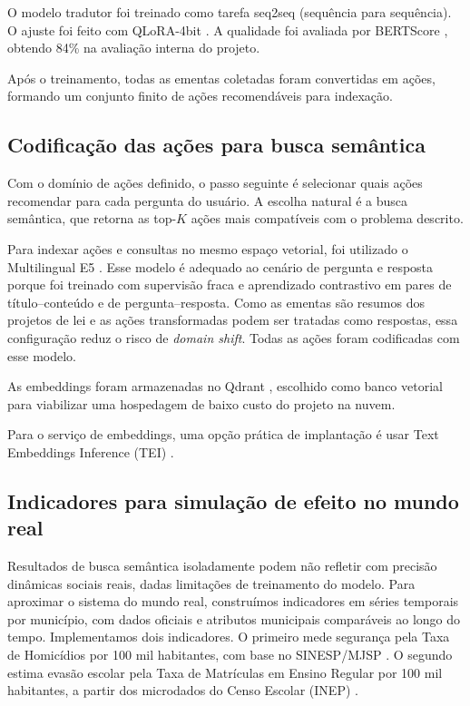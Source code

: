 \documentclass[10pt,a4paper]{article}
\begin{document}
O modelo tradutor foi treinado como tarefa seq2seq (sequência para sequência). O ajuste foi feito com QLoRA-4bit \cite{dettmers_qlora_2023}. A qualidade foi avaliada por BERTScore \cite{zhang_bertscore_2019}, obtendo 84\% na avaliação interna do projeto.

Após o treinamento, todas as ementas coletadas foram convertidas em ações, formando um conjunto finito de ações recomendáveis para indexação.

\subsection{Codificação das ações para busca semântica}
\label{sec:busca}

Com o domínio de ações definido, o passo seguinte é selecionar quais ações recomendar para cada pergunta do usuário. A escolha natural é a busca semântica, que retorna as top-$K$ ações mais compatíveis com o problema descrito.

Para indexar ações e consultas no mesmo espaço vetorial, foi utilizado o Multilingual E5 \cite{wang_e5_2024}. Esse modelo é adequado ao cenário de pergunta e resposta porque foi treinado com supervisão fraca e aprendizado contrastivo em pares de título--conteúdo e de pergunta--resposta. Como as ementas são resumos dos projetos de lei e as ações transformadas podem ser tratadas como respostas, essa configuração reduz o risco de \textit{domain shift}. Todas as ações foram codificadas com esse modelo.

As embeddings foram armazenadas no Qdrant \cite{qdrant_overview,qdrant_collections}, escolhido como banco vetorial para viabilizar uma hospedagem de baixo custo do projeto na nuvem.

Para o serviço de embeddings, uma opção prática de implantação é usar Text Embeddings Inference (TEI) \cite{hf_tei}.

\subsection{Indicadores para simulação de efeito no mundo real}
\label{sec:indicadores}

Resultados de busca semântica isoladamente podem não refletir com precisão dinâmicas sociais reais, dadas limitações de treinamento do modelo. Para aproximar o sistema do mundo real, construímos indicadores em séries temporais por município, com dados oficiais e atributos municipais comparáveis ao longo do tempo. Implementamos dois indicadores. O primeiro mede segurança pela Taxa de Homicídios por 100 mil habitantes, com base no SINESP/MJSP \cite{mjsp_homicidios}. O segundo estima evasão escolar pela Taxa de Matrículas em Ensino Regular por 100 mil habitantes, a partir dos microdados do Censo Escolar (INEP) \cite{inep_microdados_censo_escolar}.
\end{document}
